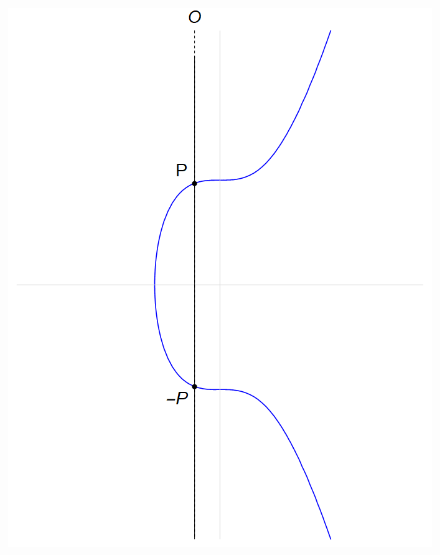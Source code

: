 \begin{figure}\centering
\begin{minipage}[t]{0.3\textwidth}
	\includegraphics[width=\textwidth]{figuras/suma_eliptica_0}
\end{minipage}
\begin{minipage}[t]{0.3\textwidth}

\end{minipage}
\end{figure}
